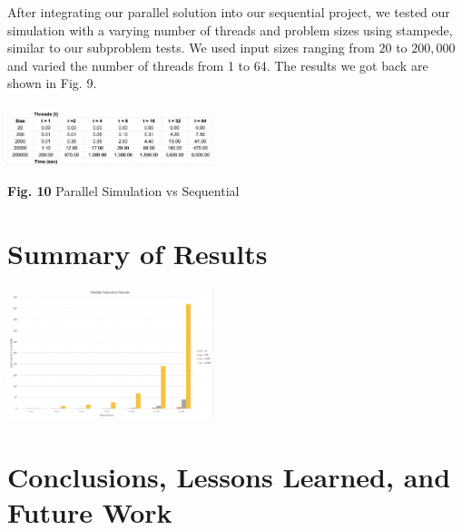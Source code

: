 \documentclass[conference]{IEEEtran}
\begin{document}
\hspace*{.2cm} After integrating our parallel solution into our sequential project, we tested our simulation with a varying number of threads and problem sizes using stampede, similar to our subproblem tests. We used input sizes ranging from $20$ to $200,000$ and varied the number of threads from 1 to 64. The results we got back are shown in Fig. 9. \\ \\

\includegraphics[width=0.45\textwidth]{images/results}
\begin{center}
	\textbf{Fig. 10} Parallel Simulation vs Sequential \\
\end{center}

\section{Summary of Results}
\includegraphics[width=0.45\textwidth]{images/timeVSthreads}

\section{Conclusions, Lessons Learned, and Future Work}
\lipsum[5]



\end{document}
